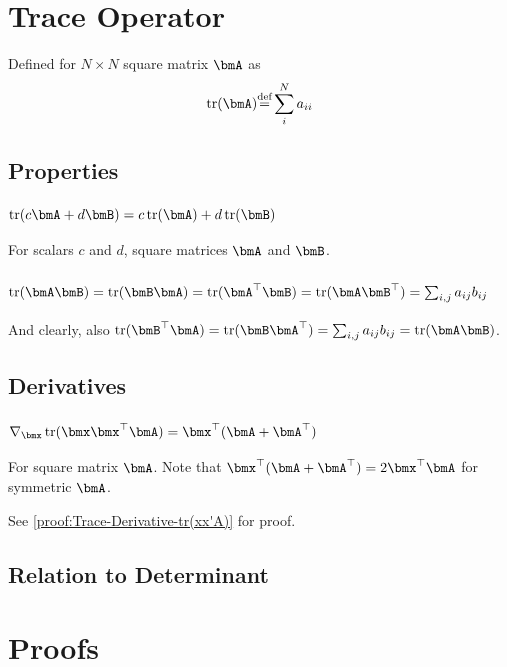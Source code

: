 \documentclass[11pt]{article}
\def\Def{{\stackrel{\text{def}}{=}}}
\DeclareMathOperator{\Trace}{tr}
\begin{document}
\section{Trace Operator}
Defined for $N \times N$ square matrix $\bmA$ as
\begin{equation}
\Trace(\bmA) \Def \sum_{i}^{N} a_{ii}
\label{eq:Definition-Trace}
\end{equation}

\subsection{Properties}

\subsubsection{$\Trace(c\bmA + d\bmB) = c\Trace(\bmA) + d\Trace(\bmB)$}
For scalars $c$ and $d$, square matrices $\bmA$ and $\bmB$.

\subsubsection{$\Trace(\bmA\bmB) = \Trace(\bmB\bmA) = \Trace(\bmA^\top\bmB) = \Trace(\bmA\bmB^\top) = \sum_{i,j} a_{ij}b_{ij}$}
And clearly, also $\Trace(\bmB^\top\bmA) = \Trace(\bmB\bmA^\top) = \sum_{i,j} a_{ij}b_{ij} = \Trace(\bmA\bmB)$.

\subsection{Derivatives}

\subsubsection{$\nabla_{\bmx}\Trace(\bmx \bmx^\top \bmA) = \bmx^\top (\bmA + \bmA^\top)$}
\label{sec:Trace-Derivative-tr(xx'A)}
For square matrix $\bmA$.
Note that $\bmx^\top (\bmA + \bmA^\top) = 2\bmx^\top \bmA$ for symmetric $\bmA$.

See \cref{proof:Trace-Derivative-tr(xx'A)} for proof.

\subsection{Relation to Determinant}

\appendix
\section{Proofs}
\end{document}
